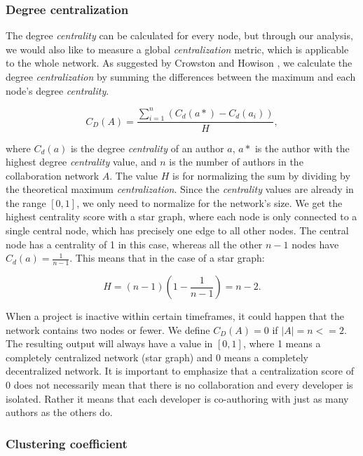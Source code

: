 \subsubsection{Degree centralization}

The degree \textit{centrality} can be calculated for every node, but through our analysis, we would also like to measure a global \textit{centralization} metric, which is applicable to the whole network. As suggested by Crowston and Howison \cite{crowstonHierarchyCentralizationFree2006}, we calculate the degree \textit{centralization} by summing the differences between the maximum and each node's degree \textit{centrality}. 

\[ C_D(A) = \frac{\sum_{i=1}^n(C_d(a*)-C_d(a_i))}{H}, \]

where $C_d(a)$ is the degree \textit{centrality} of an author $a$, $a*$ is the author with the highest degree \textit{centrality} value, and $n$ is the number of authors in the collaboration network $A$. The value $H$ is for normalizing the sum by dividing by the theoretical maximum \textit{centralization}. Since the \textit{centrality} values are already in the range $[0, 1]$, we only need to normalize for the network's size. We get the highest centrality score with a star graph, where each node is only connected to a single central node, which has precisely one edge to all other nodes. The central node has a centrality of 1 in this case, whereas all the other $n-1$ nodes have $C_d(a) = \frac{1}{n-1}$. This means that in the case of a star graph:

\[ H = (n-1) (1-\frac{1}{n-1}) = n-2. \]

When a project is inactive within certain timeframes, it could happen that the network contains two nodes or fewer. We define $C_D(A) = 0$ if $|A| = n <=2$. The resulting output will always have a value in $[0, 1]$, where 1 means a completely centralized network (star graph) and 0 means a completely decentralized network. It is important to emphasize that a centralization score of 0 does not necessarily mean that there is no collaboration and every developer is isolated. Rather it means that each developer is co-authoring with just as many authors as the others do.


\subsubsection{Clustering coefficient}
\label{sec:clustering}

